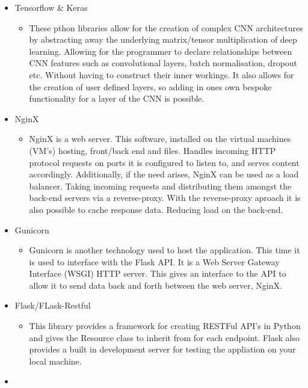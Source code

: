 \begin{itemize}
\begin{itemize}
      \end{itemize}
    \item Tensorflow \& Keras
      \begin{itemize}
        \item These pthon libraries allow for the creation of complex CNN architectures by abstracting away the underlying matrix/tensor multiplication of deep learning. Allowing for the programmer to declare relationships between CNN features such as convolutional layers, batch normalisation, dropout etc. Without having to construct their inner workings. It also allows for the creation of user defined layers, so adding in ones own bespoke functionality for a layer of the CNN is possible.
      \end{itemize}
    \item NginX
      \begin{itemize}
        \item NginX is a web server. This software, installed on the virtual machines (VM's) hosting, front/back end and files. Handles incoming HTTP protocol requests on ports it is configured to listen to, and serves content accordingly. Additionally, if the need arises, NginX can be used as a load balancer. Taking incoming requests and distributing them amongst the back-end servers via a reverse-proxy. With the reverse-proxy aproach it is also possible to cache response data. Reducing load on the back-end.
      \end{itemize}
    \item Gunicorn
      \begin{itemize}
        \item Gunicorn is another technology used to host the application. This time it is used to interface with the Flask API. It is a Web Server Gateway Interface (WSGI) HTTP server. This gives an interface to the API to allow it to send data back and forth between the web server, NginX.
      \end{itemize}
    \item Flask/FLask-Restful
      \begin{itemize}
        \item This library provides a framework for creating RESTFul API's in Python and gives the Resource class to inherit from for each endpoint. Flask also provides a built in development server for testing the appliation on your local machine.
      \end{itemize}
    \item
  \end{itemize}
